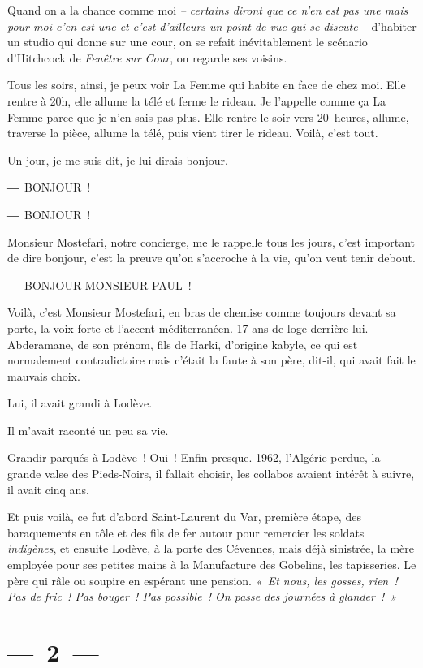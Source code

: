 \documentclass[twoside]{book} %
\begin{document}
\noindent Quand on a la chance comme moi \emph{– certains diront que ce n’en est pas une mais pour moi c’en est une et c’est d’ailleurs un point de vue qui se discute –} d’habiter un studio qui donne sur une cour, on se refait inévitablement le scénario d’Hitchcock de \emph{Fenêtre sur Cour}, on regarde ses voisins.\par
Tous les soirs, ainsi, je peux voir La Femme qui habite en face de chez moi. Elle rentre à 20h, elle allume la télé et ferme le rideau. Je l’appelle comme ça La Femme parce que je n’en sais pas plus. Elle rentre le soir vers 20 heures, allume, traverse la pièce, allume la télé, puis vient tirer le rideau. Voilà, c’est tout.\par
Un jour, je me suis dit, je lui dirais bonjour.\par
― BONJOUR !\par
― BONJOUR !\par
Monsieur Mostefari, notre concierge, me le rappelle tous les jours, c’est important de dire bonjour, c’est la preuve qu’on s’accroche à la vie, qu’on veut tenir debout.\par
― BONJOUR MONSIEUR PAUL !\par
\bigbreak
\noindent Voilà, c’est Monsieur Mostefari, en bras de chemise comme toujours devant sa porte, la voix forte et l’accent méditerranéen. 17 ans de loge derrière lui. Abderamane, de son prénom, fils de Harki, d’origine kabyle, ce qui est normalement contradictoire mais c’était la faute à son père, dit-il, qui avait fait le mauvais choix.\par
Lui, il avait grandi à Lodève.\par
Il m’avait raconté un peu sa vie.\par
Grandir parqués à Lodève ! Oui ! Enfin presque. 1962, l’Algérie perdue, la grande valse des Pieds-Noirs, il fallait choisir, les collabos avaient intérêt à suivre, il avait cinq ans.\par
Et puis voilà, ce fut d’abord Saint-Laurent du Var, première étape, des baraquements en tôle et des fils de fer autour pour remercier les soldats \emph{indigènes}, et ensuite Lodève, à la porte des Cévennes, mais déjà sinistrée, la mère employée pour ses petites mains à la Manufacture des Gobelins, les tapisseries. Le père qui râle ou soupire en espérant une pension. \emph{« Et nous, les gosses, rien ! Pas de fric ! Pas bouger ! Pas possible ! On passe des journées à glander ! »}

\section[{— 2 —}]{— 2 —}
\renewcommand{\leftmark}{— 2 —}
\end{document}
